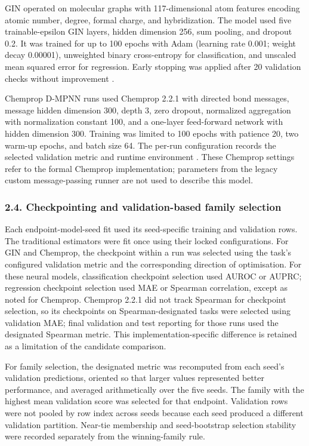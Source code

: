 \documentclass[
]{article}
\begin{document}
GIN operated on molecular graphs with 117-dimensional atom features
encoding atomic number, degree, formal charge, and hybridization. The
model used five trainable-epsilon GIN layers, hidden dimension 256, sum
pooling, and dropout 0.2. It was trained for up to 100 epochs with Adam
(learning rate 0.001; weight decay 0.00001), unweighted binary
cross-entropy for classification, and unscaled mean squared error for
regression. Early stopping was applied after 20 validation checks
without improvement \cite{xu2019gnn}.

Chemprop D-MPNN runs used Chemprop 2.2.1 with directed bond messages,
message hidden dimension 300, depth 3, zero dropout, normalized
aggregation with normalization constant 100, and a one-layer
feed-forward network with hidden dimension 300. Training was limited to
100 epochs with patience 20, two warm-up epochs, and batch size 64. The
per-run configuration records the selected validation metric and runtime
environment \cite{yang2019molecular}. These Chemprop settings refer to the formal
Chemprop implementation; parameters from the legacy custom
message-passing runner are not used to describe this model.

\subsubsection{2.4. Checkpointing and validation-based family
selection}\label{checkpointing-and-validation-based-family-selection}

Each endpoint-model-seed fit used its seed-specific training and
validation rows. The traditional estimators were fit once using their
locked configurations. For GIN and Chemprop, the checkpoint within a run
was selected using the task's configured validation metric and the
corresponding direction of optimisation. For these neural models,
classification checkpoint selection used AUROC or AUPRC; regression
checkpoint selection used MAE or Spearman correlation, except as noted
for Chemprop. Chemprop 2.2.1 did not track Spearman for checkpoint
selection, so its checkpoints on Spearman-designated tasks were selected
using validation MAE; final validation and test reporting for those runs
used the designated Spearman metric. This implementation-specific
difference is retained as a limitation of the candidate comparison.

For family selection, the designated metric was recomputed from each
seed's validation predictions, oriented so that larger values
represented better performance, and averaged arithmetically over the
five seeds. The family with the highest mean validation score was
selected for that endpoint. Validation rows were not pooled by row index
across seeds because each seed produced a different validation
partition. Near-tie membership and seed-bootstrap selection stability
were recorded separately from the winning-family rule.
\end{document}
